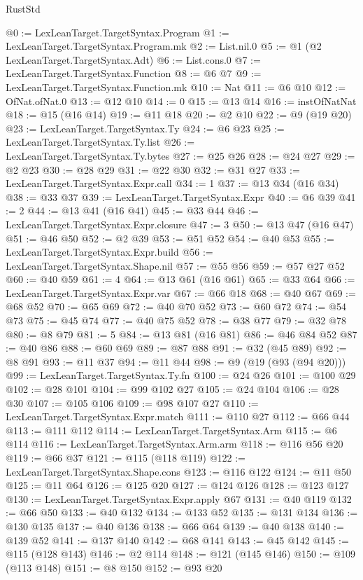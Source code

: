 \begin{lexlean}{RustStd}
\begin{coremodule}
@0 := LexLeanTarget.TargetSyntax.Program
@1 := LexLeanTarget.TargetSyntax.Program.mk
@2 := List.nil.{0}
@5 := @1 (@2 LexLeanTarget.TargetSyntax.Adt)
@6 := List.cons.{0}
@7 := LexLeanTarget.TargetSyntax.Function
@8 := @6 @7
@9 := LexLeanTarget.TargetSyntax.Function.mk
@10 := Nat
@11 := @6 @10
@12 := OfNat.ofNat.{0}
@13 := @12 @10
@14 := 0
@15 := @13 @14
@16 := instOfNatNat
@18 := @15 (@16 @14)
@19 := @11 @18
@20 := @2 @10
@22 := @9 (@19 @20)
@23 := LexLeanTarget.TargetSyntax.Ty
@24 := @6 @23
@25 := LexLeanTarget.TargetSyntax.Ty.list
@26 := LexLeanTarget.TargetSyntax.Ty.bytes
@27 := @25 @26
@28 := @24 @27
@29 := @2 @23
@30 := @28 @29
@31 := @22 @30
@32 := @31 @27
@33 := LexLeanTarget.TargetSyntax.Expr.call
@34 := 1
@37 := @13 @34 (@16 @34)
@38 := @33 @37
@39 := LexLeanTarget.TargetSyntax.Expr
@40 := @6 @39
@41 := 2
@44 := @13 @41 (@16 @41)
@45 := @33 @44
@46 := LexLeanTarget.TargetSyntax.Expr.closure
@47 := 3
@50 := @13 @47 (@16 @47)
@51 := @46 @50
@52 := @2 @39
@53 := @51 @52
@54 := @40 @53
@55 := LexLeanTarget.TargetSyntax.Expr.build
@56 := LexLeanTarget.TargetSyntax.Shape.nil
@57 := @55 @56
@59 := @57 @27 @52
@60 := @40 @59
@61 := 4
@64 := @13 @61 (@16 @61)
@65 := @33 @64
@66 := LexLeanTarget.TargetSyntax.Expr.var
@67 := @66 @18
@68 := @40 @67
@69 := @68 @52
@70 := @65 @69
@72 := @40 @70 @52
@73 := @60 @72
@74 := @54 @73
@75 := @45 @74
@77 := @40 @75 @52
@78 := @38 @77
@79 := @32 @78
@80 := @8 @79
@81 := 5
@84 := @13 @81 (@16 @81)
@86 := @46 @84 @52
@87 := @40 @86
@88 := @60 @69
@89 := @87 @88
@91 := @32 (@45 @89)
@92 := @8 @91
@93 := @11 @37
@94 := @11 @44
@98 := @9 (@19 (@93 (@94 @20)))
@99 := LexLeanTarget.TargetSyntax.Ty.fn
@100 := @24 @26
@101 := @100 @29
@102 := @28 @101
@104 := @99 @102 @27
@105 := @24 @104
@106 := @28 @30
@107 := @105 @106
@109 := @98 @107 @27
@110 := LexLeanTarget.TargetSyntax.Expr.match
@111 := @110 @27
@112 := @66 @44
@113 := @111 @112
@114 := LexLeanTarget.TargetSyntax.Arm
@115 := @6 @114
@116 := LexLeanTarget.TargetSyntax.Arm.arm
@118 := @116 @56 @20
@119 := @66 @37
@121 := @115 (@118 @119)
@122 := LexLeanTarget.TargetSyntax.Shape.cons
@123 := @116 @122
@124 := @11 @50
@125 := @11 @64
@126 := @125 @20
@127 := @124 @126
@128 := @123 @127
@130 := LexLeanTarget.TargetSyntax.Expr.apply @67
@131 := @40 @119
@132 := @66 @50
@133 := @40 @132
@134 := @133 @52
@135 := @131 @134
@136 := @130 @135
@137 := @40 @136
@138 := @66 @64
@139 := @40 @138
@140 := @139 @52
@141 := @137 @140
@142 := @68 @141
@143 := @45 @142
@145 := @115 (@128 @143)
@146 := @2 @114
@148 := @121 (@145 @146)
@150 := @109 (@113 @148)
@151 := @8 @150
@152 := @93 @20

\end{coremodule}
\end{lexlean}

